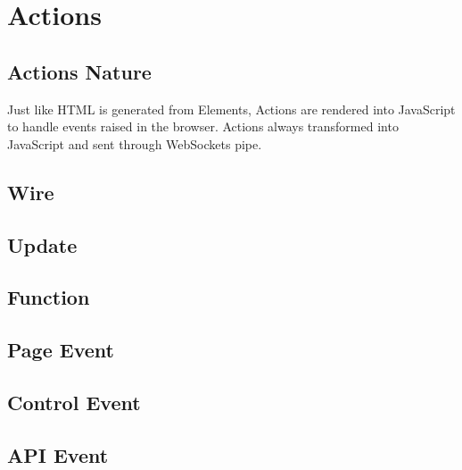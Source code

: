 \section{Actions}

\subsection{Actions Nature}
Just like HTML is generated from Elements, Actions are rendered into
JavaScript to handle events raised in the browser. Actions always
transformed into JavaScript and sent through WebSockets pipe.

\subsection{Wire}

\subsection{Update}

\subsection{Function}

\subsection{Page Event}

\subsection{Control Event}

\subsection{API Event}
